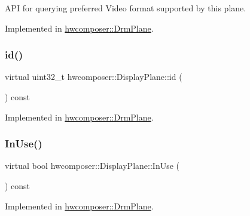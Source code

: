 A\+PI for querying preferred Video format supported by this plane. 

Implemented in \mbox{\hyperlink{classhwcomposer_1_1DrmPlane_a061caae8c703189ae6d05dbe8b303f12}{hwcomposer\+::\+Drm\+Plane}}.

\mbox{\label{classhwcomposer_1_1DisplayPlane_a0af461a6ac4beccb8ed21aec933b6eed}} 
\subsubsection{\texorpdfstring{id()}{id()}}
{\footnotesize\ttfamily virtual uint32\+\_\+t hwcomposer\+::\+Display\+Plane\+::id (\begin{DoxyParamCaption}{ }\end{DoxyParamCaption}) const\hspace{0.3cm}{\ttfamily [pure virtual]}}



Implemented in \mbox{\hyperlink{classhwcomposer_1_1DrmPlane_ae84fc513bfb1f3ee35715ff9a808f447}{hwcomposer\+::\+Drm\+Plane}}.

\mbox{\label{classhwcomposer_1_1DisplayPlane_a8461ec31b18379cc371cd0656ca0e615}} 
\subsubsection{\texorpdfstring{In\+Use()}{InUse()}}
{\footnotesize\ttfamily virtual bool hwcomposer\+::\+Display\+Plane\+::\+In\+Use (\begin{DoxyParamCaption}{ }\end{DoxyParamCaption}) const\hspace{0.3cm}{\ttfamily [pure virtual]}}



Implemented in \mbox{\hyperlink{classhwcomposer_1_1DrmPlane_aeb8c1aecd933645e7e2743b149b06302}{hwcomposer\+::\+Drm\+Plane}}.

\mbox{\label{classhwcomposer_1_1DisplayPlane_a057c78a4a3657a04c5117ee0f1dba8be}} 
